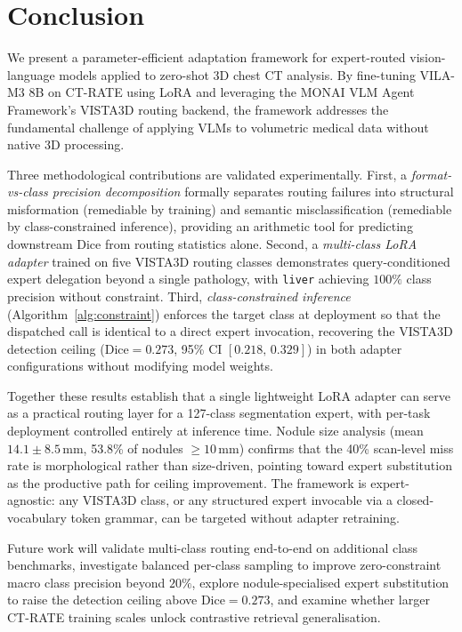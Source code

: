\documentclass[lineno,referee,pdflatex,sn-mathphys-num]{sn-jnl}
\begin{document}
\FloatBarrier
\section{Conclusion}
\label{sec:conclusion}

We present a parameter-efficient adaptation framework for expert-routed
vision-language models applied to zero-shot 3D chest CT analysis.
By fine-tuning VILA-M3 8B on CT-RATE using LoRA and leveraging the MONAI
VLM Agent Framework's VISTA3D routing backend, the framework addresses
the fundamental challenge of applying VLMs to volumetric medical data
without native 3D processing.

Three methodological contributions are validated experimentally.
First, a \emph{format-vs-class precision decomposition} formally separates
routing failures into structural misformation (remediable by training) and
semantic misclassification (remediable by class-constrained inference),
providing an arithmetic tool for predicting downstream Dice from routing
statistics alone. Second, a \emph{multi-class LoRA adapter} trained on
five VISTA3D routing classes demonstrates query-conditioned expert
delegation beyond a single pathology, with \texttt{liver} achieving $100\%$
class precision without constraint. Third, \emph{class-constrained
inference} (Algorithm~\ref{alg:constraint}) enforces the target class at
deployment so that the dispatched call is identical to a direct expert
invocation, recovering the VISTA3D detection ceiling
($\mathrm{Dice}=0.273$, 95\% CI $[0.218,\,0.329]$) in both adapter
configurations without modifying model weights.

Together these results establish that a single lightweight LoRA adapter
can serve as a practical routing layer for a 127-class segmentation expert,
with per-task deployment controlled entirely at inference time.
Nodule size analysis (mean $14.1\pm8.5$\,mm, 53.8\% of nodules
$\geq10$\,mm) confirms that the 40\% scan-level miss rate is morphological
rather than size-driven, pointing toward expert substitution as the
productive path for ceiling improvement. The framework is expert-agnostic:
any VISTA3D class, or any structured expert invocable via a closed-vocabulary
token grammar, can be targeted without adapter retraining.

Future work will validate multi-class routing end-to-end on additional
class benchmarks, investigate balanced per-class sampling to improve
zero-constraint macro class precision beyond $20\%$, explore
nodule-specialised expert substitution to raise the detection ceiling
above $\mathrm{Dice}=0.273$, and examine whether larger CT-RATE training
scales unlock contrastive retrieval generalisation.
\end{document}
